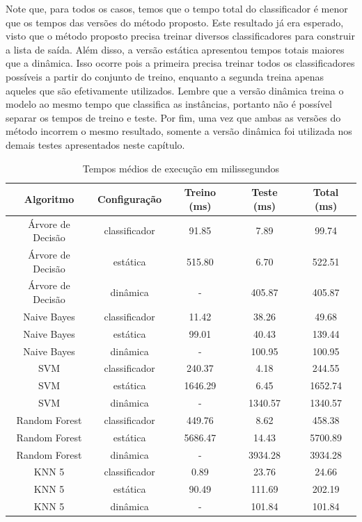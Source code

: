 Note que, para todos os casos, temos que o tempo total do classificador é menor que os tempos das versões do método proposto.
Este resultado já era esperado, visto que o método proposto precisa treinar diversos classificadores para construir a lista de saída.
Além disso, a versão estática apresentou tempos totais maiores que a dinâmica.
Isso ocorre pois a primeira precisa treinar todos os classificadores possíveis a partir do conjunto de treino, enquanto a segunda treina apenas aqueles que são efetivamente utilizados.
Lembre que a versão dinâmica treina o modelo ao mesmo tempo que classifica as instâncias, portanto não é possível separar os tempos de treino e teste.
Por fim, uma vez que ambas as versões do método incorrem o mesmo resultado, somente a versão dinâmica foi utilizada nos demais testes apresentados neste capítulo.

\begin{table}[h!]
  \begin{center}
    \resizebox{\textwidth}{!} {
    \begin{tabular}{ccccc}
      \hline
      \textbf{Algoritmo} & \textbf{Configuração} & \textbf{Treino (ms)} & \textbf{Teste (ms)} & \textbf{Total (ms)}\\
      \hline

      Árvore de Decisão & classificador & 91.85 & 7.89 & 99.74\\
      Árvore de Decisão & estática & 515.80 & 6.70 & 522.51\\
      Árvore de Decisão & dinâmica & - & 405.87 & 405.87\\
      Naive Bayes &  classificador & 11.42 & 38.26 & 49.68\\
      Naive Bayes &  estática & 99.01 & 40.43 & 139.44\\
      Naive Bayes &  dinâmica & - & 100.95 & 100.95\\
      SVM & classificador & 240.37 & 4.18 & 244.55\\
      SVM & estática & 1646.29 & 6.45 & 1652.74\\
      SVM & dinâmica & - & 1340.57 & 1340.57\\
      Random Forest &  classificador & 449.76 & 8.62 & 458.38\\
      Random Forest &  estática & 5686.47 & 14.43 & 5700.89\\
      Random Forest &  dinâmica & - & 3934.28 & 3934.28\\
      KNN 5 & classificador & 0.89 & 23.76 & 24.66\\
      KNN 5 & estática  & 90.49 & 111.69  & 202.19\\
      KNN 5 & dinâmica  & - & 101.84 & 101.84\\

      \hline
    \end{tabular}
    }
    \caption{Tempos médios de execução em milissegundos}
    \label{tab:tempostestes}
  \end{center}
\end{table}

